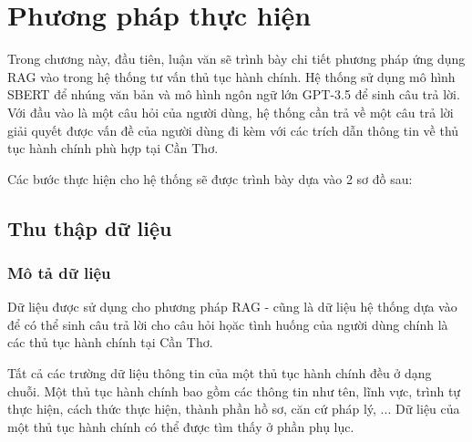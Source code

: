 \documentclass[a4paper, 12pt, openany]{book}
\begin{document}
\section{Phương pháp thực hiện}
Trong chương này, đầu tiên, luận văn sẽ trình bày chi tiết phương pháp ứng dụng RAG vào trong hệ thống tư vấn thủ tục hành chính. Hệ thống sử dụng
mô hình SBERT để nhúng văn bản và mô hình ngôn ngữ lớn GPT-3.5 để sinh câu trả lời. Với đầu vào là một câu hỏi của người dùng, 
hệ thống cần trả về một câu trả lời giải quyết được vấn đề của người dùng đi kèm với các trích dẫn thông tin về thủ tục hành chính phù hợp tại Cần Thơ.


Các bước thực hiện cho hệ thống sẽ được trình bày dựa vào 2 sơ đồ sau:
\subsection{Thu thập dữ liệu}
\subsubsection{Mô tả dữ liệu}
Dữ liệu được sử dụng cho phương pháp RAG - cũng là dữ liệu hệ thống dựa vào để có thể sinh câu trả lời cho câu hỏi họăc tình huống
của người dùng chính là các thủ tục hành chính tại Cần Thơ.

Tất cả các trường dữ liệu thông tin của một thủ tục hành chính đều ở dạng chuỗi. Một thủ tục hành chính bao gồm các thông tin như tên, lĩnh vực, trình tự thực hiện,
cách thức thực hiện, thành phần hồ sơ, căn cứ pháp lý, ... Dữ liệu của một thủ tục hành chính có thể được tìm thấy ở phần phụ lục.
\end{document}
